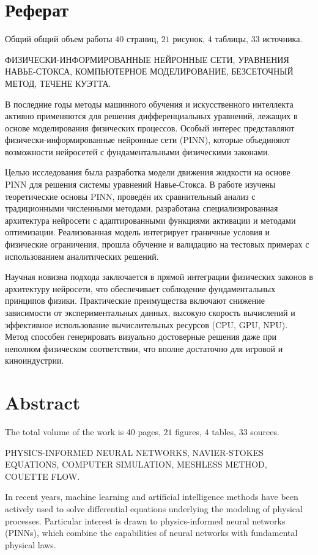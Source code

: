\chapter*{Реферат}
Общий общий объем работы $40$ страниц, $21$ рисунок, $4$ таблицы, $33$ источника.

ФИЗИЧЕСКИ-ИНФОРМИРОВАННЫЕ НЕЙРОННЫЕ СЕТИ, УРАВНЕНИЯ НАВЬЕ-СТОКСА,
КОМПЬЮТЕРНОЕ МОДЕЛИРОВАНИЕ, БЕЗСЕТОЧНЫЙ МЕТОД, ТЕЧЕНЕ КУЭТТА.

В последние годы методы машинного обучения и искусственного интеллекта активно применяются
для решения дифференциальных уравнений, лежащих в основе моделирования физических процессов.
Особый интерес представляют физически-информированные нейронные сети (PINN), которые
объединяют возможности нейросетей с фундаментальными физическими законами.

Целью исследования
была разработка модели движения жидкости на основе PINN для решения системы уравнений Навье-Стокса.
В работе изучены теоретические основы PINN, проведён их
сравнительный анализ с традиционными численными методами, разработана специализированная
архитектура нейросети с адаптированными функциями активации и методами оптимизации.
Реализованная модель интегрирует граничные условия и физические ограничения, прошла обучение
и валидацию на тестовых примерах с использованием аналитических решений.

Научная новизна подхода заключается в прямой интеграции физических законов в архитектуру
нейросети, что обеспечивает соблюдение фундаментальных принципов физики. Практические
преимущества включают снижение зависимости от экспериментальных данных, высокую скорость
вычислений и эффективное использование вычислительных ресурсов (CPU, GPU, NPU). 
Метод способен генерировать визуально достоверные решения даже при неполном физическом
соответствии, что вполне достаточно для игровой и киноиндустрии.

\chapter*{Abstract}
The total volume of the work is $40$ pages, $21$ figures, $4$ tables, $33$ sources.

PHYSICS-INFORMED NEURAL NETWORKS, NAVIER-STOKES EQUATIONS, 
COMPUTER SIMULATION, MESHLESS METHOD, COUETTE FLOW.

In recent years, machine learning and artificial intelligence methods have been actively used 
to solve differential equations underlying the modeling of physical processes. 
Particular interest is drawn to physics-informed neural networks (PINNs), which 
combine the capabilities of neural networks with fundamental physical laws.

